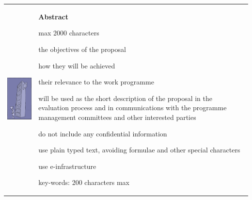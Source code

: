 \documentclass[12pt,noworkareas,deliverables,report\classoptions]{euproposal}
\begin{document}
\begin{proposal}
  \newpage\null\vfil

\medskip
\hspace{-0.8cm}
\begin{tabular}{p{}p{}}
\begin{minipage}{0.3\textwidth}
\includegraphics[width=4cm]{Illustration1_Color.jpg}
\end{minipage}
&
\begin{minipage}{10cm}
  \begin{center}\bfseries Abstract\end{center}
    max 2000 characters

    the objectives of the proposal

    how they will be achieved

    their relevance to the work programme

    will be used as the short description  of the proposal in the evaluation process and in communications  with the programme management committees and other interested parties

    do not include any confidential information

    use plain typed text, avoiding formulae and other special characters

    use e-infrastructure

    key-words: 200 characters max
\end{minipage}
\end{tabular}

  \vfil\null\newpage
  \tableofcontents


\newpage

\newpage

\newpage
\renewcommand\addcontentsline[3]{}

\newpage


\end{proposal}
\end{document}
